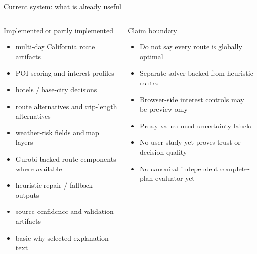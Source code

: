 \documentclass[aspectratio=169,10pt]{beamer}
\begin{document}
\begin{frame}{Current system: what is already useful}
\begin{columns}[T,onlytextwidth]
\begin{block}{Implemented or partly implemented}
\begin{itemize}
  \item multi-day California route artifacts
  \item POI scoring and interest profiles
  \item hotels / base-city decisions
  \item route alternatives and trip-length alternatives
  \item weather-risk fields and map layers
  \item Gurobi-backed route components where available
  \item heuristic repair / fallback outputs
  \item source confidence and validation artifacts
  \item basic why-selected explanation text
\end{itemize}
\end{block}

\begin{block}{Claim boundary}
\begin{itemize}
  \item Do not say every route is globally optimal
  \item Separate solver-backed from heuristic routes
  \item Browser-side interest controls may be preview-only
  \item Proxy values need uncertainty labels
  \item No user study yet proves trust or decision quality
  \item No canonical independent complete-plan evaluator yet
\end{itemize}
\end{block}
\end{columns}
\end{frame}
\end{document}
